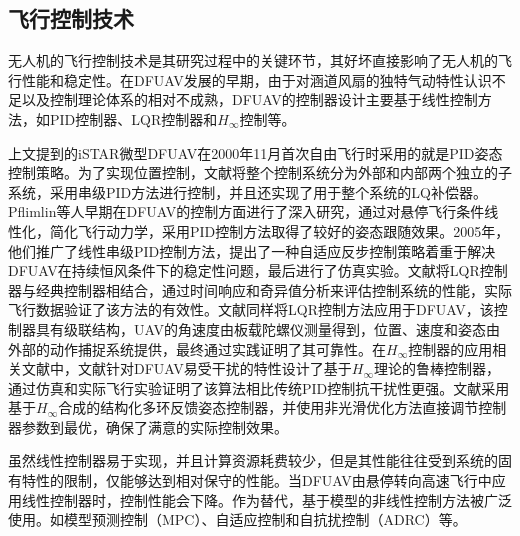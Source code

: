 \subsection{飞行控制技术}

无人机的飞行控制技术是其研究过程中的关键环节，其好坏直接影响了无人机的飞行性能和稳定性。在DFUAV发展的早期，由于对涵道风扇的独特气动特性认识不足以及控制理论体系的相对不成熟，DFUAV的控制器设计主要基于线性控制方法，如PID控制器、LQR控制器和$H_{\infty}$控制等。

上文提到的iSTAR微型DFUAV在2000年11月首次自由飞行时采用的就是PID姿态控制策略\cite{lipera2001micro}。为了实现位置控制，文献\parencite{erikssonPerformanceEstimationDucted2006}将整个控制系统分为外部和内部两个独立的子系统，采用串级PID方法进行控制，并且还实现了用于整个系统的LQ补偿器。Pflimlin等人早期在DFUAV的控制方面进行了深入研究\cite{pflimlinAerodynamicModelingPractical2007,pflimlinModelingAttitudeControl2010a}，通过对悬停飞行条件线性化，简化飞行动力学，采用PID控制方法取得了较好的姿态跟随效果。2005年，他们推广了线性串级PID控制方法，提出了一种自适应反步控制策略着重于解决DFUAV在持续恒风条件下的稳定性问题，最后进行了仿真实验\cite{pflimlinPositionControlDucted2007b}。文献\parencite{whiteStabilityAugmentationFree}将LQR控制器与经典控制器相结合，通过时间响应和奇异值分析来评估控制系统的性能，实际飞行数据验证了该方法的有效性。文献\parencite{muehlebachFlyingPlatformTestbed2017}同样将LQR控制方法应用于DFUAV，该控制器具有级联结构，UAV的角速度由板载陀螺仪测量得到，位置、速度和姿态由外部的动作捕捉系统提供，最终通过实践证明了其可靠性。在$H_{\infty}$控制器的应用相关文献中，文献\parencite{DJKZ201009016}针对DFUAV易受干扰的特性设计了基于$H_{\infty}$理论的鲁棒控制器，通过仿真和实际飞行实验证明了该算法相比传统PID控制抗干扰性更强。文献\parencite{fanModellingAttitudeController2018}采用基于$H_{\infty}$合成的结构化多环反馈姿态控制器，并使用非光滑优化方法直接调节控制器参数到最优，确保了满意的实际控制效果。

虽然线性控制器易于实现，并且计算资源耗费较少，但是其性能往往受到系统的固有特性的限制，仅能够达到相对保守的性能\cite{manzoor2022flight}。当DFUAV由悬停转向高速飞行中应用线性控制器时\cite{saeedSurveyHybridUnmanned2018}，控制性能会下降。作为替代，基于模型的非线性控制方法被广泛使用。如模型预测控制（MPC）、自适应控制和自抗扰控制（ADRC）等。

